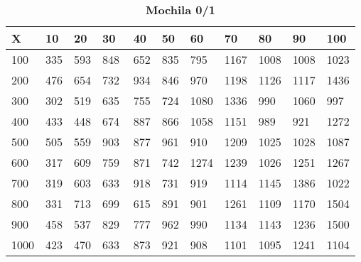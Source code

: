 \documentclass[10pt,letterpaper]{article}
\begin{document}
\newpage 
{}
\begin{center}
\begin{table}\renewcommand{\arraystretch}{2.5}
\caption{\large \textbf{Mochila 0/1}}
\centering
\begin{tabular} { |m{0.5cm}|m{1.3cm}|m{1.3cm}|m{1.3cm}|m{1.3cm}|m{1.3cm}|m{1.3cm}|m{1.3cm}|m{1.3cm}|m{1.3cm}|m{1.3cm}|} 
\hline
\rowcolor{Gray}
\centering \textbf{X} & \centering \textbf{10} & \centering \textbf{20} & \centering \textbf{30}\ & \centering \textbf{40} & \centering \textbf{50} & \centering \textbf{60}\ & \centering \textbf{70} & \centering \textbf{80} & \centering \textbf{90}\ & \textbf{100} \\\hline
\cellcolor{Gray}100 & \Large 335 & \Large 593 & \Large 848 & \Large 652 & \Large 835 & \Large 795 & \Large 1167 & \Large 1008 & \Large 1008 & \Large 1023 \\
\hline
\cellcolor{Gray}200 & \Large 476 & \Large 654 & \Large 732 & \Large 934 & \Large 846 & \Large 970 & \Large 1198 & \Large 1126 & \Large 1117 & \Large 1436 \\
\hline
\cellcolor{Gray}300 & \Large 302 & \Large 519 & \Large 635 & \Large 755 & \Large 724 & \Large 1080 & \Large 1336 & \Large 990 & \Large 1060 & \Large 997 \\
\hline
\cellcolor{Gray}400 & \Large 433 & \Large 448 & \Large 674 & \Large 887 & \Large 866 & \Large 1058 & \Large 1151 & \Large 989 & \Large 921 & \Large 1272 \\
\hline
\cellcolor{Gray}500 & \Large 505 & \Large 559 & \Large 903 & \Large 877 & \Large 961 & \Large 910 & \Large 1209 & \Large 1025 & \Large 1028 & \Large 1087 \\
\hline
\cellcolor{Gray}600 & \Large 317 & \Large 609 & \Large 759 & \Large 871 & \Large 742 & \Large 1274 & \Large 1239 & \Large 1026 & \Large 1251 & \Large 1267 \\
\hline
\cellcolor{Gray}700 & \Large 319 & \Large 603 & \Large 633 & \Large 918 & \Large 731 & \Large 919 & \Large 1114 & \Large 1145 & \Large 1386 & \Large 1022 \\
\hline
\cellcolor{Gray}800 & \Large 331 & \Large 713 & \Large 699 & \Large 615 & \Large 891 & \Large 901 & \Large 1261 & \Large 1109 & \Large 1170 & \Large 1504 \\
\hline
\cellcolor{Gray}900 & \Large 458 & \Large 537 & \Large 829 & \Large 777 & \Large 962 & \Large 990 & \Large 1134 & \Large 1143 & \Large 1236 & \Large 1500 \\
\hline
\cellcolor{Gray}1000 & \Large 423 & \Large 470 & \Large 633 & \Large 873 & \Large 921 & \Large 908 & \Large 1101 & \Large 1095 & \Large 1241 & \Large 1104 \\
\hline
\end{tabular} \\
\end{table}
\end{center}
\end{document}
